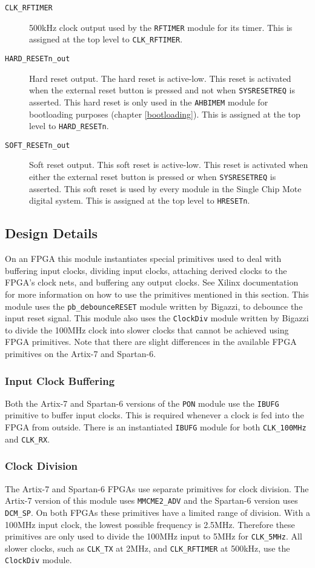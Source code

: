 \begin{description}
	\item[\texttt{CLK\_RFTIMER}] 500kHz clock output used by the \texttt{RFTIMER} module for its timer. This is assigned at the top level to \texttt{CLK\_RFTIMER}.
	\item[\texttt{HARD\_RESETn\_out}] Hard reset output. The hard reset is active-low. This reset is activated when the external reset button is pressed and not when \texttt{SYSRESETREQ} is asserted. This hard reset is only used in the \texttt{AHBIMEM} module for bootloading purposes (chapter \ref{bootloading}). This is assigned at the top level to \texttt{HARD\_RESETn}.
	\item[\texttt{SOFT\_RESETn\_out}] Soft reset output. This soft reset is active-low. This reset is activated when either the external reset button is pressed or when \texttt{SYSRESETREQ} is asserted. This soft reset is used by every module in the Single Chip Mote digital system. This is assigned at the top level to \texttt{HRESETn}.
\end{description}

\subsection{Design Details}
On an FPGA this module instantiates special primitives used to deal with buffering input clocks, dividing input clocks, attaching derived clocks to the FPGA's clock nets, and buffering any output clocks. See Xilinx documentation for more information on how to use the primitives mentioned in this section. This module uses the \texttt{pb\_debounceRESET} module written by Bigazzi, to debounce the input reset signal. This module also uses the \texttt{ClockDiv} module written by Bigazzi to divide the 100MHz clock into slower clocks that cannot be achieved using FPGA primitives. Note that there are slight differences in the available FPGA primitives on the Artix-7 and Spartan-6.

\subsubsection{Input Clock Buffering}
Both the Artix-7 and Spartan-6 versions of the \texttt{PON} module use the \texttt{IBUFG} primitive to buffer input clocks. This is required whenever a clock is fed into the FPGA from outside. There is an instantiated \texttt{IBUFG} module for both \texttt{CLK\_100MHz} and \texttt{CLK\_RX}.

\subsubsection{Clock Division}
The Artix-7 and Spartan-6 FPGAs use separate primitives for clock division. The Artix-7 version of this module uses \texttt{MMCME2\_ADV} and the Spartan-6 version uses \texttt{DCM\_SP}. On both FPGAs these primitives have a limited range of division. With a 100MHz input clock, the lowest possible frequency is 2.5MHz. Therefore these primitives are only used to divide the 100MHz input to 5MHz for \texttt{CLK\_5MHz}. All slower clocks, such as \texttt{CLK\_TX} at 2MHz, and \texttt{CLK\_RFTIMER} at 500kHz, use the \texttt{ClockDiv} module.

